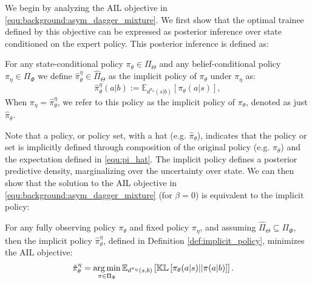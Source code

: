 \label{sec:prelim}

We begin by analyzing the AIL objective in \eqref{equ:background:asym_dagger_mixture}.  We first show that the optimal trainee defined by this objective can be expressed as posterior inference over state conditioned on the expert policy.  This posterior inference is defined as:
\begin{definition}
\label{def:implicit_policy}
For any state-conditional policy $\pi_{\theta} \in \Pi_{\Theta}$ and any belief-conditional policy $\pi_{\eta} \in \Pi_{\Phi}$ we define $\hat{\pi}^\eta_{\theta} \in \hat{\Pi}_{\Theta}$ as the implicit policy of $\pi_{\theta}$ under $\pi_{\eta}$ as:
\begin{equation}
    {\hat{\pi}}_{\theta}^{\eta}(a|b) := \mathbb{E}_{d^{\pi_{\eta}}(s | b)}  \left[ \pi_{\theta}(a|s) \right] , \label{equ:pi_hat} 
\end{equation}
When $\pi_{\eta} = {\hat{\pi}}_{\theta}^{\eta}$, we refer to this policy as the implicit policy of $\pi_{\theta}$, denoted as just ${\hat{\pi}}_{\theta}$.
\end{definition}
Note that a policy, or policy set, with a hat (e.g. $\hat{\pi}_{\theta}$), indicates that the policy or set is implicitly defined through composition of the original policy (e.g. $\pi_{\theta}$) and the expectation defined in \eqref{equ:pi_hat}.  The implicit policy defines a posterior predictive density, marginalizing over the uncertainty over state.  We can then show that the solution to the AIL objective in \eqref{equ:background:asym_dagger_mixture} (for $\beta = 0$) is equivalent to the implicit policy:
\begin{theorem}
\label{def:ail}
For any fully observing policy $\pi_{\theta}$ and fixed policy $\pi_{\eta}$, and assuming $\hat{\Pi}_{\Theta} \subseteq \Pi_{\Phi}$, then the implicit policy $\hat{\pi}_{\theta}^{\eta}$, defined in Definition \ref{def:implicit_policy}, minimizes the AIL objective:
\begin{align}
      &\hat{\pi}_{\theta}^{\eta} =
      \mathop{\operatorname{arg\,min}}_{\pi \in \Pi_{\Phi}} \mathbb{E}_{d^{\pi_{\eta}}(s,b)}  \left[ \mathbb{KL} \left[ \pi_{\theta}(a|s) || \pi(a|b) \right] \right]. \label{equ:prelim:ail_target}
\end{align}
\end{theorem}
